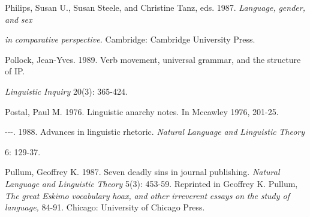 \begin{styleStandard}
Philips, Susan U., Susan Steele, and Christine Tanz, eds. 1987. \textit{Language,}\textit{ }\textit{gender,}\textit{ }\textit{and}\textit{ }\textit{sex}
\end{styleStandard}


\begin{styleStandard}
\textit{in}\textit{ }\textit{comparative}\textit{ }\textit{perspective.}\textit{ }Cambridge: Cambridge University Press.
\end{styleStandard}


\begin{styleStandard}
Pollock, Jean-Yves. 1989. Verb movement, universal grammar, and the structure of IP.
\end{styleStandard}


\begin{styleStandard}
\textit{Linguistic}\textit{ }\textit{Inquiry}\textit{ }20(3): 365-424.
\end{styleStandard}


\begin{styleStandard}
Postal, Paul M. 1976. Linguistic anarchy notes. In Mccawley 1976, 201-25.
\end{styleStandard}


\begin{styleStandard}
{}-{}-{}-. 1988. Advances in linguistic rhetoric. \textit{Natural}\textit{ }\textit{Language}\textit{ }\textit{and}\textit{ }\textit{Linguistic}\textit{ }\textit{Theory}
\end{styleStandard}


\begin{styleStandard}
6: 129-37.
\end{styleStandard}


\begin{styleStandard}
Pullum, Geoffrey K. 1987. Seven deadly sins in journal publishing. \textit{Natural}\textit{ }\textit{Language}\textit{ }\textit{and}\textit{ }\textit{Linguistic}\textit{ }\textit{Theory}\textit{ }5(3): 453-59. Reprinted in Geoffrey K. Pullum, \textit{The}\textit{ }\textit{great}\textit{ }\textit{Eskimo}\textit{ }\textit{vocabulary}\textit{ }\textit{hoax,}\textit{ }\textit{and}\textit{ }\textit{other}\textit{ }\textit{irreverent}\textit{ }\textit{essays}\textit{ }\textit{on}\textit{ }\textit{the}\textit{ }\textit{study of}\textit{ }\textit{language,}\textit{ }84-91. Chicago: University of Chicago Press.
\end{styleStandard}


